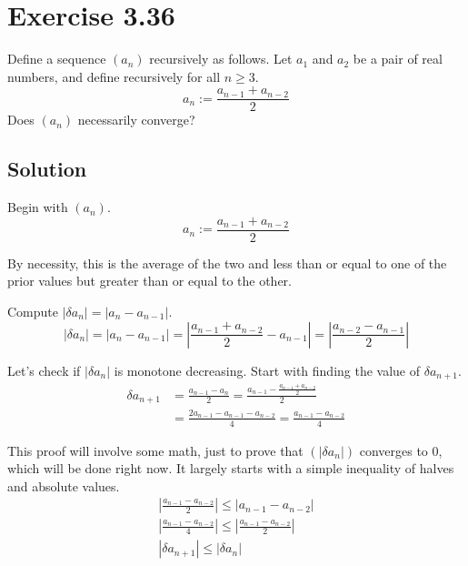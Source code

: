 \documentclass[12pt]{report}
\begin{document}
\section{Exercise 3.36}
    Define a sequence $(a_n)$ recursively as follows. Let $a_1$ and $a_2$ be a pair of real numbers, and define recursively for all $n \geq 3$.
    \begin{equation*}
        a_n := \frac{a_{n - 1} + a_{n - 2}}{2}
    \end{equation*}
    Does $(a_n)$ necessarily converge?

    \subsection{Solution}
        Begin with $(a_n)$.
        \begin{equation}
            a_n := \frac{a_{n - 1} + a_{n - 2}}{2}
        \end{equation}

        By necessity, this is the average of the two and less than or equal to one of the prior values but greater than or equal to the other.
        
        Compute $\left| \delta a_n \right| = \left| a_n - a_{n-1} \right|$.
        \begin{equation}
            \left| \delta a_n \right|  =   \left| a_n - a_{n-1} \right| 
                =   \left| \frac{a_{n - 1} + a_{n - 2}}{2} - a_{n - 1} \right|
                =   \left| \frac{a_{n - 2} - a_{n - 1}}{2} \right|
        \end{equation}

        Let's check if $\left| \delta a_n \right|$ is monotone decreasing.
        Start with finding the value of $\delta a_{n+1}$.
        \begin{align}
            \delta a_{n+1}  &=   \frac{a_{n - 1} - a_n}{2}
                =   \frac{a_{n - 1} - \frac{a_{n - 1} + a_{n - 2}}{2}}{2}\\
                &=  \frac{2 a_{n - 1} - a_{n - 1} - a_{n - 2}}{4}
                =   \frac{a_{n - 1} - a_{n - 2}}{4}
        \end{align}

        This proof will involve some math, just to prove that $\left( \left| \delta a_n \right| \right)$ converges to 0, which will be done right now.
        It largely starts with a simple inequality of halves and absolute values.
        \begin{gather}
            \left| \frac{a_{n - 1} - a_{n - 2}}{2} \right| \leq \left| a_{n - 1} - a_{n - 2} \right|\\
            \left| \frac{a_{n - 1} - a_{n - 2}}{4} \right| \leq \left| \frac{a_{n - 1} - a_{n - 2}}{2} \right|\\
            \left| \delta a_{n + 1} \right| \leq \left| \delta a_n \right|
        \end{gather}
\end{document}
